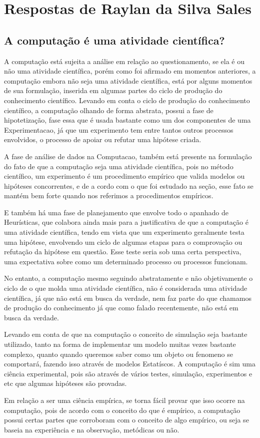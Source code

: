 \section{Respostas de Raylan da Silva Sales}

\subsection{A computação é uma atividade científica?}

A computação está sujeita a análise em relação ao questionamento, se ela é ou não uma atividade científica, porém como foi afirmado em momentos anteriores, a computação embora não seja uma atividade científica, está por alguns momentos de sua formulação, inserida em algumas partes do ciclo de produção do conhecimento científico. Levando em conta o ciclo de produção do conhecimento científico, a computação olhando de forma abstrata, possui a fase de hipotetização, fase essa que é usada bastante como um dos componentes de uma \gls{Experimentacao}, já que um experimento tem entre tantos outros processos envolvidos, o processo de apoiar ou refutar uma hipótese criada.

A fase de análise de dados na \gls{Computacao}, também está presente na formulação do fato de que a computação seja uma atividade científica, pois no método científico, um experimento é um procedimento empírico que valida modelos ou hipóteses concorrentes, e de a cordo com o que foi estudado na seção, esse fato se mantém bem forte quando nos referimos a procedimentos empíricos.

E também há uma fase de planejamento que envolve todo o apanhado de \gls{Heurísticas}, que colabora ainda mais para a justificativa de que a computação é uma atividade científica, tendo em vista que um experimento geralmente testa uma hipótese, envolvendo um ciclo de algumas etapas para o comprovação ou refutação da hipótese em questão. Esse teste seria sob uma certa perspectiva, uma expectativa sobre como um determinado processo ou processos funcionam.

No entanto, a computação mesmo seguindo abstratamente e não objetivamente o ciclo de o que molda uma atividade científica, não é considerada uma atividade científica, já que não está em busca da verdade, nem faz parte do que chamamos de produção do conhecimento já que como falado recentemente, não está em busca da verdade.


Levando em conta de que na computação o conceito de simulação seja bastante utilizado, tanto na forma de implementar um modelo muitas vezes bastante complexo, quanto quando queremos saber como um objeto ou \gls{fenomeno} se comportará, fazendo isso através de modelos \gls{Estatíscos}. A computação é sim uma ciência experimental, pois são através de vários testes, simulação, experimentos e etc que algumas hipóteses são provadas.

Em relação a ser uma ciência empírica, se torna fácil provar que isso ocorre na computação, pois de acordo com o conceito do que é empírico, a computação possui certas partes que corroboram com o conceito de algo empírico, ou seja se baseia na experiência e na observação, metódicas ou não.
